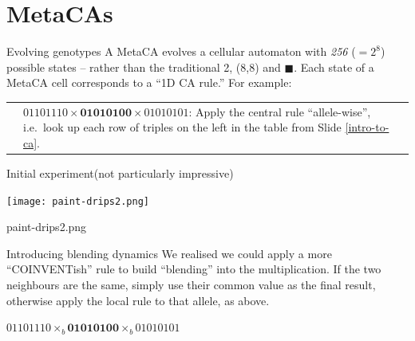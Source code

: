\part{MetaCAs}
\frame{\partpage}

\begin{frame}{Evolving genotypes}{}
A {MetaCA } evolves a cellular automaton with \emph{{\color{red}2}{\color{LimeGreen}5}{\color{blue}6}} ($=2^8$) possible
states -- rather than the traditional 2, \framebox(8,8){} and $\blacksquare$.
Each state of a MetaCA cell corresponds to a ``1D CA rule.''  For example:\\[.3in]
\begin{tabular}{l@{\hskip -.1in}p{2.5in}}
\begin{fminipage}{1.7in}

\end{fminipage} & 
\vspace*{-.7in}
$01101110\times \mathbf{01010100}\times 01010101$: Apply the central rule ``allele-wise'', i.e.~look up each row of triples on the left in the table
from Slide \ref{intro-to-ca}. 
\end{tabular}
\end{frame}

\begin{frame}{Initial experiment}{(not particularly impressive)}
\begin{center}
\texttt{[image: paint-drips2.png]}

\pause
paint-drips2.png
\end{center}
\end{frame}

\begin{frame}{Introducing blending dynamics}{}
We realised we could apply a more ``COINVENTish'' rule to build
``blending'' into the multiplication.  If the two neighbours are the
same, simply use their common value as the final result, otherwise apply
the local rule to that allele, as above.
\begin{center}
\begin{fminipage}{2.7in}

\end{fminipage} 

$01101110\times_b \mathbf{01010100}\times_b 01010101$ 
\end{center}
\end{frame}

